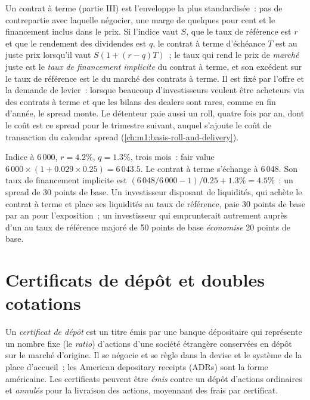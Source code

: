 Un contrat à terme (partie III) est l'enveloppe la plus standardisée~: pas de contrepartie avec laquelle négocier,
une marge de quelques pour cent et le financement inclus dans le prix.
Si l'indice vaut $S$, que le taux de référence est $r$ et que le rendement des dividendes est $q$,
le contrat à terme d'échéance $T$ est au juste prix lorsqu'il vaut $S(1+(r-q)T)$~; le taux qui rend le
prix de \emph{marché} juste est le \emph{taux de financement implicite} du contrat à terme, et
son excédent sur le taux de référence est le  du marché des contrats à terme.
Il est fixé par l'offre et la demande de levier~: lorsque beaucoup d'investisseurs veulent être
acheteurs via des contrats à terme et que les bilans des dealers sont rares, comme en
fin d'année, le spread monte. Le détenteur paie aussi un roll, quatre fois par an,
dont le coût est ce spread pour le trimestre suivant, auquel s'ajoute le coût de transaction
du calendar spread (\cref{ch:m1:basis-roll-and-delivery}).

\begin{example}\label{ex:m1:delta-one-instruments:implied}
Indice à 6\,000, $r = 4.2\%$, $q = 1.3\%$, trois mois~: fair value $6\,000
\times (1 + 0.029 \times 0.25) = 6\,043.5$. Le contrat à terme s'échange à 6\,048. Son
taux de financement implicite est $(6\,048/6\,000 - 1)/0.25 + 1.3\% = 4.5\%$~: un
spread de 30 points de base. Un investisseur disposant de liquidités, qui achète le contrat à terme
et place ses liquidités au taux de référence, paie 30 points de base par an pour
l'exposition~; un investisseur qui emprunterait autrement auprès d'un  au taux
de référence majoré de 50 points de base \emph{économise} 20 points de base.
\end{example}

\section{Certificats de dépôt et doubles cotations}

\begin{definition}\label{def:m1:delta-one-instruments:dr}
Un \emph{certificat de dépôt} est un titre émis par une banque
dépositaire qui représente un nombre fixe (le \emph{ratio}) d'actions
d'une société étrangère conservées en dépôt sur le marché d'origine. Il se négocie et se règle
dans la devise et le système de la place d'accueil~; les American depositary
receipts (ADRs) sont la forme américaine. Les certificats peuvent être \emph{émis} contre un
dépôt d'actions ordinaires et \emph{annulés} pour la livraison des actions,
moyennant des frais par certificat.
\end{definition}

